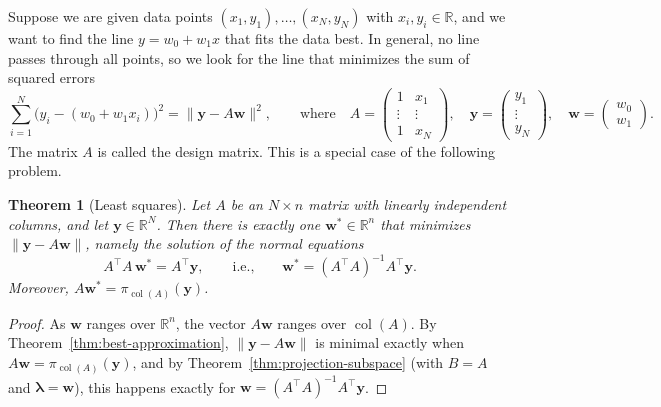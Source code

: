 \documentclass[11pt]{article}
\newcommand{\norm}[1]{\lVert #1 \rVert}
\theoremstyle{definition}
\theoremstyle{plain}
\newtheorem{theorem}[definition]{Theorem}
\theoremstyle{remark}
\DeclareMathOperator{\col}{col}
\begin{document}
Suppose we are given data points $(x_1, y_1), \ldots, (x_N, y_N)$ with $x_i, y_i \in \mathbb{R}$, and we want to find the line $y = w_0 + w_1 x$ that fits the data best. In general, no line passes through all points, so we look for the line that minimizes the sum of squared errors
\[\sum_{i=1}^N \big(y_i - (w_0 + w_1 x_i)\big)^2 = \norm{\mathbf{y} - A\mathbf{w}}^2, \qquad \text{where} \quad A = \begin{pmatrix} 1 & x_1 \\ \vdots & \vdots \\ 1 & x_N \end{pmatrix}, \quad \mathbf{y} = \begin{pmatrix} y_1 \\ \vdots \\ y_N \end{pmatrix}, \quad \mathbf{w} = \begin{pmatrix} w_0 \\ w_1 \end{pmatrix}.\]
The matrix $A$ is called the design matrix. This is a special case of the following problem.

\begin{theorem}[Least squares]\label{thm:least-squares}
    Let $A$ be an $N \times n$ matrix with linearly independent columns, and let $\mathbf{y} \in \mathbb{R}^N$. Then there is exactly one $\mathbf{w}^* \in \mathbb{R}^n$ that minimizes $\norm{\mathbf{y} - A\mathbf{w}}$, namely the solution of the normal equations
    \[A^\top A \, \mathbf{w}^* = A^\top \mathbf{y}, \qquad \text{i.e.,} \qquad \mathbf{w}^* = (A^\top A)^{-1} A^\top \mathbf{y}.\]
    Moreover, $A\mathbf{w}^* = \pi_{\col(A)}(\mathbf{y})$.
\end{theorem}

\begin{proof}
    As $\mathbf{w}$ ranges over $\mathbb{R}^n$, the vector $A\mathbf{w}$ ranges over $\col(A)$. By Theorem~\ref{thm:best-approximation}, $\norm{\mathbf{y} - A\mathbf{w}}$ is minimal exactly when $A\mathbf{w} = \pi_{\col(A)}(\mathbf{y})$, and by Theorem~\ref{thm:projection-subspace} (with $B = A$ and $\boldsymbol{\lambda} = \mathbf{w}$), this happens exactly for $\mathbf{w} = (A^\top A)^{-1} A^\top \mathbf{y}$.
\end{proof}
\end{document}
